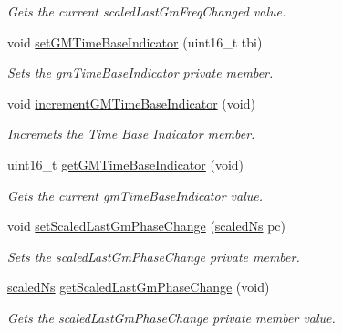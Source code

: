 \begin{DoxyCompactItemize}
\begin{DoxyCompactList}\small\item\em Gets the current scaled\+Last\+Gm\+Freq\+Changed value. \end{DoxyCompactList}\item 
void \hyperlink{class_follow_up_t_l_v_a4d1293d955327fa9bf8fffc61b6d990c}{set\+G\+M\+Time\+Base\+Indicator} (uint16\+\_\+t tbi)
\begin{DoxyCompactList}\small\item\em Sets the gm\+Time\+Base\+Indicator private member. \end{DoxyCompactList}\item 
void \hyperlink{class_follow_up_t_l_v_ab8bc64bc01f5a180e269377f3af6d65c}{increment\+G\+M\+Time\+Base\+Indicator} (void)
\begin{DoxyCompactList}\small\item\em Incremets the Time Base Indicator member. \end{DoxyCompactList}\item 
uint16\+\_\+t \hyperlink{class_follow_up_t_l_v_ad7a016b1865179daf06f37ae3b16a074}{get\+G\+M\+Time\+Base\+Indicator} (void)
\begin{DoxyCompactList}\small\item\em Gets the current gm\+Time\+Base\+Indicator value. \end{DoxyCompactList}\item 
void \hyperlink{class_follow_up_t_l_v_ab7e977e03240f3cf8c280ec32a5d62bb}{set\+Scaled\+Last\+Gm\+Phase\+Change} (\hyperlink{classscaled_ns}{scaled\+Ns} pc)
\begin{DoxyCompactList}\small\item\em Sets the scaled\+Last\+Gm\+Phase\+Change private member. \end{DoxyCompactList}\item 
\hyperlink{classscaled_ns}{scaled\+Ns} \hyperlink{class_follow_up_t_l_v_a90337dbb2f1edb667b8e11524a978992}{get\+Scaled\+Last\+Gm\+Phase\+Change} (void)
\begin{DoxyCompactList}\small\item\em Gets the scaled\+Last\+Gm\+Phase\+Change private member value. \end{DoxyCompactList}\end{DoxyCompactItemize}
